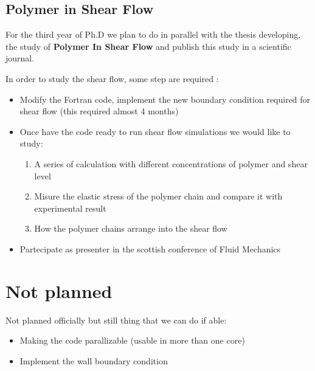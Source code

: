 \subsection{Polymer in Shear Flow}
For the third year of Ph.D we plan to do in parallel with the thesis developing, the study of \textbf{Polymer In Shear Flow} and publish this study in a scientific journal.  

In order to study the shear flow, some step are required :

\begin{itemize}
    \item  Modify the Fortran code, implement the new boundary condition required for shear flow (this required almost 4 months)
    \item  Once have the code ready to run shear flow simulations we would like to study: 
        \begin{enumerate}
            \item A series of calculation with different concentrations of polymer and shear level
            \item Misure the elastic stress of the polymer chain and compare it with experimental result 
            \item How the polymer chains arrange into the shear flow 
        \end{enumerate} 
    \item Partecipate as presenter in the scottish conference of Fluid Mechanics
\end{itemize}

\section{Not planned}
Not planned officially but still thing that we can do if able:
\begin{itemize}
    \item Making the code parallizable (usable in more than one core) 
    \item Implement the wall boundary condition 
\end{itemize}    




